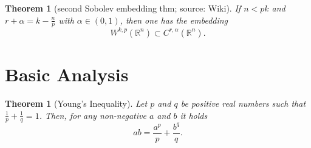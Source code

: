 \documentclass[12pt,a4paper]{article}
\newtheorem{thm}[definition]{Theorem}
\begin{document}
\begin{thm}[second Sobolev embedding thm; source: Wiki]
If $n<pk$ and $r+\alpha=k-\frac{n}{p}$ with $\alpha \in (0,1)$, then one has the embedding
\begin{equation}
W^{k,p}(\mathbb{R}^n) \subset C^{r,\alpha}(\mathbb{R}^n).
\end{equation}
\end{thm}


\section{Basic Analysis}

\begin{thm}[Young's Inequality]
Let $p$ and $q$ be positive real numbers such that $\frac{1}{p} + \frac{1}{q} = 1$. Then, for any non-negative $a$ and $b$ it holds
\begin{equation}
ab=\frac{a^p}{p}+\frac{b^q}{q}.
\end{equation}
\end{thm}
\end{document}
